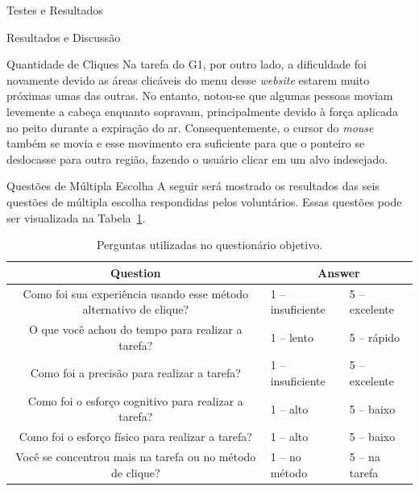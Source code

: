 \begin{chapter}{Testes e Resultados}
\begin{section}{Resultados e Discussão}
\begin{subsection}{Quantidade de Cliques}
Na tarefa do G1, por outro lado, a dificuldade foi novamente devido as áreas
clicáveis do menu desse \textit{website} estarem muito próximas umas das
outras. No entanto, notou-se que algumas pessoas moviam levemente a cabeça
enquanto sopravam, principalmente devido à força aplicada no peito durante a
expiração do ar. Consequentemente, o cursor do \textit{mouse} também se movia e
esse movimento era suficiente para que o ponteiro se deslocasse para outra
região, fazendo o usuário clicar em um alvo indesejado.
\end{subsection}

\begin{subsection}{Questões de Múltipla Escolha}
A seguir será mostrado os resultados das seis questões de múltipla escolha 
respondidas pelos voluntários. Essas questões pode ser visualizada na
Tabela~\ref{tab:quest}.

\begin{table}[!h]
\centering
\small
\def\arraystretch{1.0}
\begin{tabular}{c|ll}
	\hline
	\hline
	 \textbf{Question} &\multicolumn{2}{c}{\textbf{Answer}} \\
	\hline
	 Como foi sua experiência usando esse método alternativo de clique? & 1 -- insuficiente        & 5 -- excelente   \\
	 O que você achou do tempo para realizar a tarefa?                  & 1 -- lento               & 5 -- rápido      \\
	 Como foi a precisão para realizar a tarefa?                        & 1 -- insuficiente        & 5 -- excelente   \\
	 Como foi o esforço cognitivo para realizar a tarefa?               & 1 -- alto                & 5 -- baixo       \\
	 Como foi o esforço físico para realizar a tarefa?                  & 1 -- alto                & 5 -- baixo       \\
	 Você se concentrou mais na tarefa ou no método de clique?          & 1 -- no método           & 5 -- na tarefa   \\
	\hline
	\hline
\end{tabular}
\caption{Perguntas utilizadas no questionário objetivo.}
\label{tab:quest}
\end{table}


\end{subsection}
\end{section}
\end{chapter}
